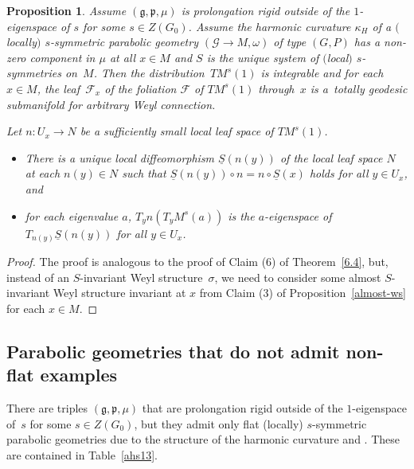 \documentclass[10pt,a4paper]{amsart}
\newcommand{\om}{\omega}
\newcommand{\si}{\sigma}
\newcommand{\un}{\underline}
\newcommand{\ba}{\mathcal{G}}
\newcommand{\fg}{\mathfrak g}
\newcommand{\fp}{\mathfrak p}
\numberwithin{equation}{section}
\newtheorem{Proposition}[Theorem]{Proposition}
 { \theoremstyle{definition}
\newtheorem{Definition}[Theorem]{Definition}
\newtheorem{Example}[Theorem]{Example}
\newtheorem{Remark}[Theorem]{Remark} }
\begin{document}
\begin{Proposition}\label{6.6}
Assume $(\fg,\fp,\mu)$ is prolongation rigid outside of the $1$-eigenspace of $s$ for some $s\in Z(G_0)$. Assume the harmonic curvature $\kappa_H$ of a $($locally$)$ $s$-symmetric parabolic geo\-met\-ry $(\ba\to M,\om)$ of type $(G,P)$ has a non-zero component in $\mu$ at all $x\in M$ and $S$ is the unique system of $($local$)$ $s$-symmetries on~$M$. Then the distribution~$TM^s(1)$ is integrable and for each $x \in M$, the leaf~$\mathcal{F}_x$ of the foliation $\mathcal{F}$ of $TM^s(1)$ through~$x$ is a~totally geodesic submanifold for arbitrary Weyl connection.

Let $n\colon U_x\to N$ be a sufficiently small local leaf space of $TM^s(1)$.
\begin{itemize}\itemsep=0pt
\item There is a unique local diffeomorphism $\un S(n(y))$ of the local leaf space $N$ at each $n(y)\in N$ such that $\un S(n(y))\circ n=n\circ \un S(x)$ holds for all $y\in U_x$, and
\item for each eigenvalue $a$, $T_yn(T_yM^s(a))$ is the $a$-eigenspace of $T_{n(y)}\un S(n(y))$ for all $y\in U_x$.
\end{itemize}
\end{Proposition}
\begin{proof}
The proof is analogous to the proof of Claim (6) of Theorem~\ref{6.4}, but, instead of an $S$-invariant Weyl structure~$\si$, we need to consider some almost $S$-invariant Weyl structure invariant at $x$ from Claim (3) of Proposition~\ref{almost-ws} for each $x\in M$.
\end{proof}

\subsection{Parabolic geometries that do not admit non-f\/lat examples}

There are triples $(\fg,\fp,\mu)$ that are prolongation rigid outside of the $1$-eigenspace of~$s$ for some $s\in Z(G_0)$, but they admit only f\/lat (locally) $s$-symmetric parabolic geometries due to the structure of the harmonic curvature and \cite[Lemma~2.2]{GZ2}. These are contained in Table~\ref{ahs13}.
\end{document}
